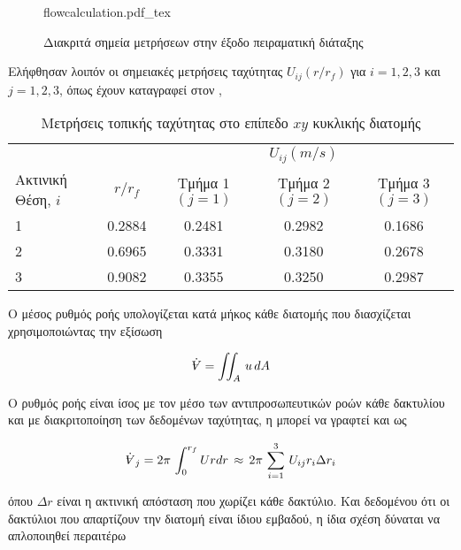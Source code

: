 \begin{refsection}
\begin{figure}[!htbp]
\centering    
{flowcalculation.pdf_tex}
\caption{Διακριτά σημεία μετρήσεων στην έξοδο πειραματική διάταξης}
\label{fig:flowcalc}
\end{figure}

Ελήφθησαν λοιπόν οι σημειακές μετρήσεις ταχύτητας $U_{ij}(r/r_f)$ για $i = 1, 2, 3$ και $j = 1, 2, 3$, όπως έχουν καταγραφεί στον ,

\begin{table}[!htbp]
\caption{Μετρήσεις τοπικής ταχύτητας στο επίπεδο $xy$ κυκλικής διατομής}
\centering
\label{tab:flowcalc}
\begin{tabular}{@{}lcccc@{}}
\toprule
& & \multicolumn{3}{c}{$U_{ij} (m/s)$} \\
\cmidrule{3-5}
 Ακτινική Θέση, $i$ & $r/r_f$ & Τμήμα 1 $(j = 1)$ & Τμήμα 2 $(j = 2)$  & Τμήμα 3 $(j = 3)$ \\ 
\midrule
1 & 0.2884 & 0.2481 & 0.2982 & 0.1686 \\

2 & 0.6965 & 0.3331 & 0.3180 & 0.2678 \\

3 & 0.9082 & 0.3355 & 0.3250 & 0.2987 \\
\bottomrule
\end{tabular}
\end{table}

Ο μέσος ρυθμός ροής υπολογίζεται κατά μήκος κάθε διατομής που διασχίζεται χρησιμοποιώντας την εξίσωση 

\begin{align}\label{eq:flow}
\dot{\volume} = \iint_A \,u \,dA
\end{align}

\noindent Ο ρυθμός ροής είναι ίσος με τον μέσο των αντιπροσωπευτικών ροών κάθε δακτυλίου και με διακριτοποίηση των δεδομένων ταχύτητας, η  μπορεί να γραφτεί και ως

\begin{align*}
\dot{\volume}_j = 2\pi \, \int_{0}^{r_f} Urdr \, \approx \, 2\pi \, \sum_{i = 1}^{3} \, U_{ij}r_{i} \Delta r_{i}
\end{align*}

\noindent όπου $\Delta r$ είναι η ακτινική απόσταση που χωρίζει κάθε δακτύλιο. Και δεδομένου ότι οι δακτύλιοι που απαρτίζουν την διατομή είναι ίδιου εμβαδού, η ίδια σχέση δύναται να απλοποιηθεί περαιτέρω


\end{refsection}
